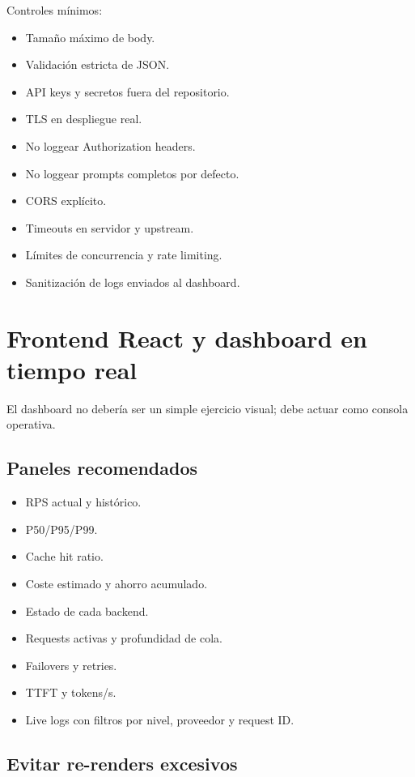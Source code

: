 \documentclass[11pt,a4paper]{article}
\begin{document}
Controles mínimos:

\begin{itemize}
  \item Tamaño máximo de body.
  \item Validación estricta de JSON.
  \item API keys y secretos fuera del repositorio.
  \item TLS en despliegue real.
  \item No loggear Authorization headers.
  \item No loggear prompts completos por defecto.
  \item CORS explícito.
  \item Timeouts en servidor y upstream.
  \item Límites de concurrencia y rate limiting.
  \item Sanitización de logs enviados al dashboard.
\end{itemize}

\section{Frontend React y dashboard en tiempo real}

El dashboard no debería ser un simple ejercicio visual; debe actuar como consola operativa.

\subsection{Paneles recomendados}

\begin{itemize}
  \item RPS actual y histórico.
  \item P50/P95/P99.
  \item Cache hit ratio.
  \item Coste estimado y ahorro acumulado.
  \item Estado de cada backend.
  \item Requests activas y profundidad de cola.
  \item Failovers y retries.
  \item TTFT y tokens/s.
  \item Live logs con filtros por nivel, proveedor y request ID.
\end{itemize}

\subsection{Evitar re-renders excesivos}
\end{document}
